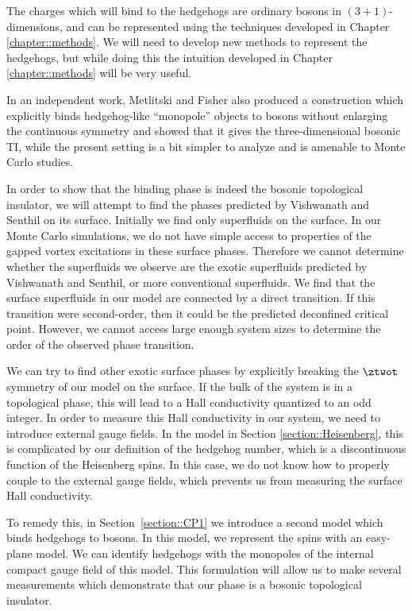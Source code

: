 The charges which will bind to the hedgehogs are ordinary bosons in $(3+1)$-dimensions, and can be represented using the techniques developed in Chapter \ref{chapter::methods}. We will need to develop new methods to represent the hedgehogs, but while doing this the intuition developed in Chapter \ref{chapter::methods} will be very useful.

In an independent work, Metlitski and Fisher also produced a construction which explicitly binds hedgehog-like ``monopole'' objects to bosons without enlarging the continuous symmetry and showed that it gives the three-dimensional bosonic TI,\cite{Max} while the present setting is a bit simpler to analyze and is amenable to Monte Carlo studies.

In order to show that the binding phase is indeed the bosonic topological insulator, we will attempt to find the phases predicted by Vishwanath and Senthil on its surface. Initially we find only superfluids on the surface. In our Monte Carlo simulations, we do not have simple access to properties of the gapped vortex excitations in these surface phases. Therefore we cannot determine whether the superfluids we observe are the exotic superfluids predicted by Vishwanath and Senthil, or more conventional superfluids. We find that the surface superfluids in our model are connected by a direct transition. If this transition were second-order, then it could be the predicted deconfined critical point. However, we cannot access large enough system sizes to determine the order of the observed phase transition.

We can try to find other exotic surface phases by explicitly breaking the $\ztwot$ symmetry of our model on the surface. If the bulk of the system is in a topological phase, this will lead to a Hall conductivity quantized to an odd integer. In order to measure this Hall conductivity in our system, we need to introduce external gauge fields. In the model in Section \ref{section::Heisenberg}, this is complicated by our definition of the hedgehog number, which is a discontinuous function of the Heisenberg spins. In this case, we do not know how to properly couple to the external gauge fields, which prevents us from measuring the surface Hall conductivity.

To remedy this, in Section~\ref{section::CP1} we introduce a second model which binds hedgehogs to bosons. In this model, we represent the spins with an easy-plane \cp model. We can identify hedgehogs with the monopoles of the internal compact gauge field of this \cp model. This formulation will allow us to make several measurements which demonstrate that our phase is a bosonic topological insulator.

